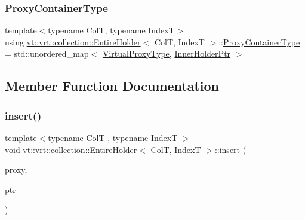 \mbox{\label{structvt_1_1vrt_1_1collection_1_1_entire_holder_a40524236d95912099482d033b337db81}} 
\subsubsection{\texorpdfstring{Proxy\+Container\+Type}{ProxyContainerType}}
{\footnotesize\ttfamily template$<$typename ColT, typename IndexT$>$ \\
using \hyperlink{structvt_1_1vrt_1_1collection_1_1_entire_holder}{vt\+::vrt\+::collection\+::\+Entire\+Holder}$<$ ColT, IndexT $>$\+::\hyperlink{structvt_1_1vrt_1_1collection_1_1_entire_holder_a40524236d95912099482d033b337db81}{Proxy\+Container\+Type} =  std\+::unordered\+\_\+map$<$ \hyperlink{namespacevt_a1b417dd5d684f045bb58a0ede70045ac}{Virtual\+Proxy\+Type}, \hyperlink{structvt_1_1vrt_1_1collection_1_1_entire_holder_a33e5814cfc24ea357365fa5e2296b08f}{Inner\+Holder\+Ptr} $>$}



\subsection{Member Function Documentation}
\mbox{\label{structvt_1_1vrt_1_1collection_1_1_entire_holder_a2b659e216ee3aa05de503f2fa89cc825}} 
\subsubsection{\texorpdfstring{insert()}{insert()}}
{\footnotesize\ttfamily template$<$typename ColT , typename IndexT $>$ \\
void \hyperlink{structvt_1_1vrt_1_1collection_1_1_entire_holder}{vt\+::vrt\+::collection\+::\+Entire\+Holder}$<$ ColT, IndexT $>$\+::insert (\begin{DoxyParamCaption}\item[{\hyperlink{namespacevt_a1b417dd5d684f045bb58a0ede70045ac}{Virtual\+Proxy\+Type} const \&}]{proxy,  }\item[{\hyperlink{structvt_1_1vrt_1_1collection_1_1_entire_holder_a33e5814cfc24ea357365fa5e2296b08f}{Inner\+Holder\+Ptr}}]{ptr }\end{DoxyParamCaption})\hspace{0.3cm}{\ttfamily [static]}}

